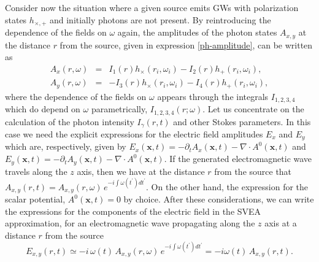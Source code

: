 \documentclass[a4paper,11pt]{article}
\newcommand{\bs}{\boldsymbol}
\begin{document}
Consider now the situation where a given source emits GWs with polarization states $ h_{\times, +}$ and initially photons are not present. By reintroducing the dependence of the fields on $\omega$ again, the amplitudes of the photon states $ A_{x, y}$ at the distance $r$ from the source, given in expression \eqref{ph-amplitude}, can be written as
\begin{eqnarray}\label{ph-amplitude-1}
 A_x(r, \omega) &=&I_1(r) h_\times(r_i, \omega_i)-I_2(r) h_+(r_i, \omega_i),\nonumber \\
 A_y(r, \omega) &=&-I_3(r) h_\times(r_i, \omega_i)-I_4( r) h_+(r_i, \omega_i),
\end{eqnarray}
where the dependence of the fields on $\omega$ appears through the integrals $I_{1, 2, 3, 4}$ which do depend on $\omega$ parametrically, $I_{1, 2, 3, 4}(r; \omega)$.
Let us concentrate on the calculation of the photon intensity $I_\gamma(r, t)$ and other Stokes parameters. In this case we need the explicit expressions for the electric field amplitudes $E_x$ and $E_y$ which are, respectively, given by $E_x(\bs x, t)=-\partial_t A_x(\bs x, t)-\nabla\cdot A^0(\bs x, t)$ and $E_y(\bs x, t)=-\partial_t A_y(\bs x, t)-\nabla\cdot A^0(\bs x, t)$. If the generated electromagnetic wave travels along the $z$ axis, then we have at the distance $r$ from the source that $A_{x, y}(r, t)= A_{x, y}(r, \omega)\,e^{-i\int \omega(t^\prime) dt^\prime}$. On the other hand, the expression for the scalar potential, $A^0(\bs x, t)=0$ by choice. After these considerations, we can write the expressions for the components of the electric field in the SVEA approximation, for an electromagnetic wave propagating along the $z$ axis at a distance $r$ from the source
\begin{equation}\label{ele-field}
E_{x, y}(r, t) \simeq -i\,\omega(t)\, A_{x, y}(r, \omega)\,e^{-i\int \omega(t^\prime) dt^\prime}=-i \omega(t)\, A_{x, y}(r, t).
\end{equation}
\end{document}
